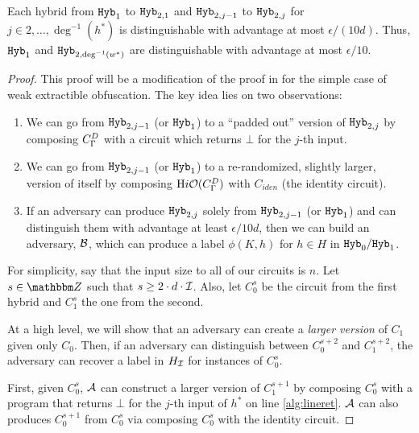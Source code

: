 \begin{lemma}
	\label{lemma:hybB}
	Each hybrid from $\texttt{Hyb}_1$ to $\texttt{Hyb}_{2, 1}$ and $\texttt{Hyb}_{2, j - 1}$ to $\texttt{Hyb}_{2, j}$ for $j \in 2, \dots, \deg^{-1}(h^*)$
	is distinguishable with advantage at most $\epsilon / (10d)$. Thus, $\texttt{Hyb}_1$ and $\texttt{Hyb}_{2, \deg^{-1}(w^*)}$ are distinguishable with advantage at most $\epsilon / 10$.
	\begin{proof}
		This proof will be a modification of the proof in \cite{ishai2015public} for the simple case of weak extractible obfuscation.
		The key idea lies on two observations:
		\begin{enumerate}[labelsep=0.1em]
			\item We can go from $\texttt{Hyb}_{2, j - 1}$ (or $\texttt{Hyb}_1$) to a ``padded out'' version of $\texttt{Hyb}_{2, j}$ by 
			composing ${C_\Gamma^D}$ with a circuit which returns $\bot$ for the $j$-th input.
			\item We can go from $\texttt{Hyb}_{2, j - 1}$ (or $\texttt{Hyb}_1$) to a re-randomized, slightly larger, version of itself by composing $\text{H}i\mathcal{O}({C_\Gamma^D})$ with $C_{iden}$ (the identity circuit).
			\item If an adversary can produce $\texttt{Hyb}_{2, j}$ solely from $\texttt{Hyb}_{2, j - 1}$ (or $\texttt{Hyb}_1$) and can distinguish them with advantage at least $\epsilon / 10d$,
			then we can build an adversary, $\mathcal{B}$, which can produce a label $\phi(K, h)$ for $h \in H$ in $\texttt{Hyb}_0/ \texttt{Hyb}_1$.
		\end{enumerate}

		For simplicity, say that the input size to all of our circuits is $n$. Let $s \in \Z$ such that $s \geq 2 \cdot d \cdot \mathcal{I}$.
		Also, let $C_0^s$ be the circuit from the first hybrid and $C_1^s$ the one from the second.

		At a high level, we will show that an adversary can create a \emph{larger version} of $C_1$ given only $C_0$. Then, 
		if an adversary can distinguish between $C_0^{s + 2}$ and $C_1^{s + 2}$, the adversary can recover a label in $H_{\mathcal{I}}$
		for instances of $C_0^s$.

		First, given $C_0^s$, $\mathcal{A}$ can construct a larger version of $C_1^{s + 1}$ by 
		composing $C_0^s$ with a program that returns $\bot$ for the $j$-th input of $h^*$ on line \ref{alg:lineret}.
		$\mathcal{A}$ can also produces $C_0^{s + 1}$ from $C_0^s$ via composing $C_0^s$ with the identity circuit.


\end{proof}
\end{lemma}
